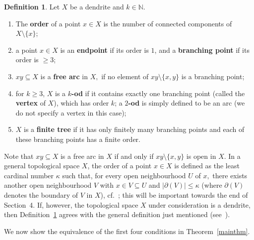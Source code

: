\documentclass[12pt]{amsart}
\theoremstyle{definition}
\newtheorem{definition}[theorem]{Definition}
\numberwithin{equation}{section}
\begin{document}
\begin{definition}\label{order}
Let $X$ be a dendrite and $k \in \mathbb N.$
\begin{enumerate}
\item The {\bf order} of a point $x\in X$ is the number of connected components of $X\setminus\{x\}$;
\item a point $x\in X$ is an {\bf endpoint} if its order is $1$, and a {\bf branching point} if its order is $\geq 3$;
\item $xy \subseteq X$ is a {\bf free arc} in $X,$ if no element of $xy \setminus\{x,y\}$ is a branching point;
\item for $k\geq 3$, $X$ is a {\bf $k$-od} if it contains exactly one branching point (called the {\bf vertex} of $X$), 
         which has order $k$; a {\bf $2$-od} is simply defined to be an arc (we do not specify a vertex in this case);
\item $X$ is a {\bf finite tree} if it has only finitely many branching points and each of these branching points has a 
         finite order.
\end{enumerate}
\end{definition}

Note that $xy \subseteq X$ is a free arc in $X$ if and only if $xy \setminus\{x,y\}$ is open in $X.$ In a general topological space $X$, the order of a point $x\in X$ is defined as the least cardinal number $\kappa$ such that, for every open neighbourhood $U$ of $x,$ there exists another open neighbourhood $V$ with $x\in V\subseteq U$ and $|\partial(V)|\leq\kappa$ (where $\partial(V)$ denotes the boundary of $V$ in $X$), cf.~\cite[Definition~9.3]{nadler}; this will be important towards the end of Section~4. If, however, the topological space $X$ under consideration is a dendrite, then Definition~\ref{order} agrees with the general definition just mentioned 
(see~\cite[Lemma~10.12, Theorem~10.13 and Corollary~10.20.1]{nadler}).

We now show the equivalence of the first four conditions in Theorem~\ref{mainthm}.
\end{document}
